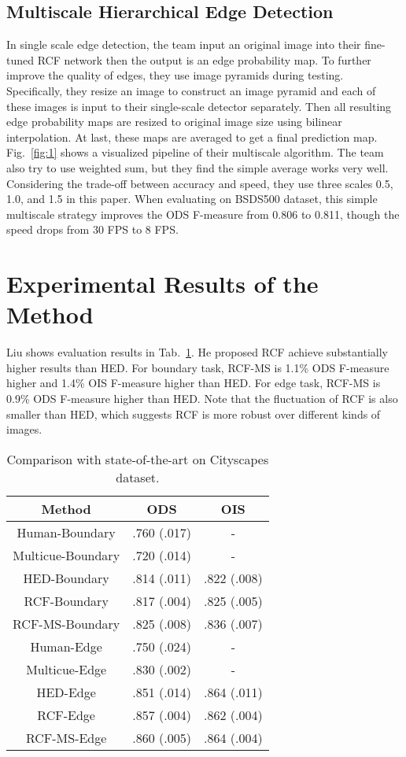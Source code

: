\documentclass[10pt,twocolumn,letterpaper]{article}
\begin{document}
\subsection{Multiscale Hierarchical Edge Detection}

In single scale edge detection, the team input an original image into their fine-tuned RCF network then the output is an edge probability map. To further improve the quality of edges, they use image pyramids during testing. Specifically, they resize an image to construct an image pyramid and each of these images is input to their single-scale detector separately. Then all resulting edge probability maps are resized to original image size using bilinear interpolation. At last, these maps are averaged to get a final prediction map. Fig.~\ref{fig:1} shows a visualized pipeline of their multiscale algorithm. The team also try to use weighted sum, but they find the simple average works very well. Considering the trade-off between accuracy and speed, they use three scales 0.5, 1.0, and 1.5 in this paper. When evaluating on BSDS500 \cite{arbelaez2011contour} dataset, this simple multiscale strategy improves the ODS F-measure from 0.806 to 0.811, though the speed drops from 30 FPS to 8 FPS.

\section{Experimental Results of the Method}

Liu shows evaluation results in Tab.~\ref{Com}. He proposed RCF achieve substantially higher results than HED. For boundary task, RCF-MS is 1.1\% ODS F-measure higher and 1.4\% OIS F-measure higher than HED. For edge task, RCF-MS is 0.9\% ODS F-measure higher than HED. Note that the fluctuation of RCF is also smaller than HED, which suggests RCF is more robust over different kinds of images.

\begin{table}[tp]
	\caption{Comparison with state-of-the-art on Cityscapes dataset.} \label{Com}
	\begin{tabular}{c|c|c}
		   \hline
		   Method & ODS & OIS \\
		   \hline\hline
		   Human-Boundary \cite{mely2016systematic} & .760 (.017) & - \\
		   Multicue-Boundary \cite{mely2016systematic} & .720 (.014) & - \\
		   HED-Boundary  & .814 (.011) & .822 (.008) \\
		   RCF-Boundary & .817 (.004) & .825 (.005) \\
		   RCF-MS-Boundary & .825 (.008) & .836 (.007) \\
		   \hline
		   Human-Edge \cite{mely2016systematic} & .750 (.024) & - \\
		   Multicue-Edge \cite{mely2016systematic} & .830 (.002) & - \\
		   HED-Edge  &.851 (.014) & .864 (.011) \\
		   RCF-Edge & .857 (.004) & .862 (.004) \\
		   RCF-MS-Edge & .860 (.005) & .864 (.004) \\
		   \hline
	\end{tabular}
\end{table}

{\small


}
\end{document}
